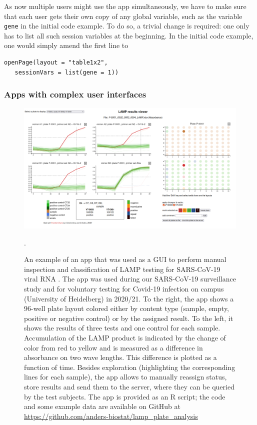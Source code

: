 \documentclass[twocolumn,10pt]{article}
\begin{document}
As now multiple users might use the app simultaneously, we have to make sure that each user gets their own copy of any global variable, such as the variable \texttt{gene} in the initial code example. To do so, a trivial change is required: one only has to list all such session variables at the beginning. In the initial code example, one would simply amend the first line to 
\begin{verbatim}
openPage(layout = "table1x2", 
   sessionVars = list(gene = 1))
\end{verbatim}

\subsubsection{Apps with complex user interfaces}\label{gui_apps}

\begin{figure}[t]
   \includegraphics[width=\textwidth]{FigG/figG.png}
   \caption{An example of an app that was used as a GUI to perform manual inspection and classification of LAMP testing for SARS-CoV-19 viral RNA \citep{daothi_2020}. The app was used during our SARS-CoV-19 surveillance study \citep{deckert_2021} and for voluntary testing for Covid-19 infection on campus (University of Heidelberg) in 2020/21. To the right, the app shows a 96-well plate layout colored either by content type (sample, empty, positive or negative control) or by the assigned result. To the left, it shows the results of three tests and one control for each sample. Accumulation of the LAMP product is indicated by the change of color from red to yellow and is measured as a difference in absorbance on two wave lengths. This difference is plotted as a function of time. Besides exploration (highlighting the corresponding lines for each sample), the app allows to manually reassign status, store results and send them to the server, where they can be queried by the test subjects. The app is provided as an R script; the code and some example data are available on GitHub at \url{https://github.com/anders-biostat/lamp_plate_analysis}}.
   \label{lc_FigG}
\end{figure}
\end{document}
